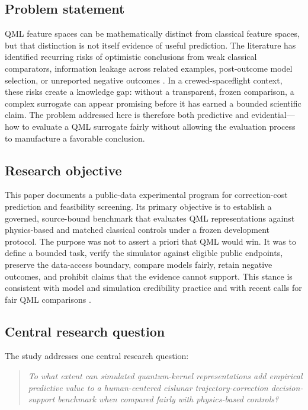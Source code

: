 \subsection{Problem statement}

QML feature spaces can be mathematically distinct from classical feature
spaces, but that distinction is not itself evidence of useful prediction.
The literature has identified recurring risks of optimistic conclusions from
weak classical comparators, information leakage across related examples,
post-outcome model selection, or unreported negative outcomes
\cite{bowles2024,schnabel2024}. In a crewed-spaceflight context, these risks
create a knowledge gap: without a transparent, frozen comparison, a complex
surrogate can appear promising before it has earned a bounded scientific
claim. The problem addressed here is therefore both predictive and
evidential---how to evaluate a QML surrogate fairly without allowing the
evaluation process to manufacture a favorable conclusion.

\subsection{Research objective}

This paper documents a public-data experimental program for correction-cost
prediction and feasibility screening. Its primary
objective is to establish a governed, source-bound benchmark that evaluates
QML representations against physics-based and matched classical controls under
a frozen development protocol. The purpose was not to assert a priori that QML
would win. It was to define a bounded task, verify the simulator against
eligible public endpoints, preserve the data-access boundary, compare models
fairly, retain negative outcomes, and prohibit claims that the evidence cannot
support. This stance is consistent with model and simulation credibility
practice \cite{nasa7009} and with recent calls for fair QML comparisons
\cite{bowles2024,schnabel2024}.

\subsection{Central research question}

The study addresses one central research question:

\begin{quote}
\emph{To what extent can simulated quantum-kernel representations add
empirical predictive value to a human-centered cislunar
trajectory-correction decision-support benchmark when compared fairly with
physics-based controls?}
\end{quote}

